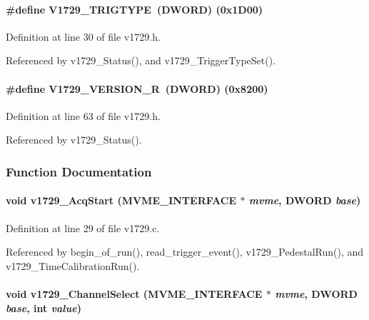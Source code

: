 \paragraph[{V1729\_\-TRIGTYPE}]{\setlength{\rightskip}{0pt plus 5cm}\#define V1729\_\-TRIGTYPE~({\bf DWORD}) (0x1D00)}\hfill\label{v1729_8h_ad099ff56426730ae558021885d19e89b}


Definition at line 30 of file v1729.h.

Referenced by v1729\_\-Status(), and v1729\_\-TriggerTypeSet().
\paragraph[{V1729\_\-VERSION\_\-R}]{\setlength{\rightskip}{0pt plus 5cm}\#define V1729\_\-VERSION\_\-R~({\bf DWORD}) (0x8200)}\hfill\label{v1729_8h_ac46fe0aebd8fb20d836bd95487559b71}


Definition at line 63 of file v1729.h.

Referenced by v1729\_\-Status().

\subsubsection{Function Documentation}
\paragraph[{v1729\_\-AcqStart}]{\setlength{\rightskip}{0pt plus 5cm}void v1729\_\-AcqStart ({\bf MVME\_\-INTERFACE} $\ast$ {\em mvme}, \/  {\bf DWORD} {\em base})}\hfill\label{v1729_8h_ada0344e2f7a00d26cc500f480fb47e4c}


Definition at line 29 of file v1729.c.

Referenced by begin\_\-of\_\-run(), read\_\-trigger\_\-event(), v1729\_\-PedestalRun(), and v1729\_\-TimeCalibrationRun().
\paragraph[{v1729\_\-ChannelSelect}]{\setlength{\rightskip}{0pt plus 5cm}void v1729\_\-ChannelSelect ({\bf MVME\_\-INTERFACE} $\ast$ {\em mvme}, \/  {\bf DWORD} {\em base}, \/  int {\em value})}\hfill\label{v1729_8h_a4bcd20b1e434c5aab7dd6ceeed8cdbc6}


